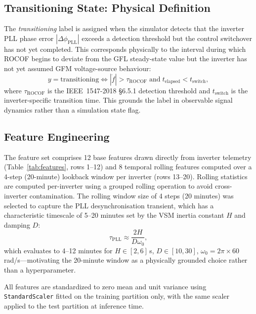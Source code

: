 \documentclass[journal]{IEEEtran}
\begin{document}
\subsection{Transitioning State: Physical Definition}
\label{sec:transitioning_def}

The \emph{transitioning} label is assigned when the simulator detects
that the inverter PLL phase error $|\Delta\phi_\text{PLL}|$ exceeds
a detection threshold but the control switchover has not yet completed.
This corresponds physically to the interval during which ROCOF begins
to deviate from the GFL steady-state value but the inverter has not yet
assumed GFM voltage-source behaviour:
\begin{equation}
  y = \text{transitioning} \iff
  |\dot{f}| > \tau_{\text{ROCOF}}
  \;\text{and}\;
  t_\text{elapsed} < t_\text{switch},
  \label{eq:trans_def}
\end{equation}
where $\tau_{\text{ROCOF}}$ is the IEEE~1547-2018 \S6.5.1 detection
threshold and $t_\text{switch}$ is the inverter-specific transition time.
This grounds the label in observable signal dynamics rather than a
simulation state flag.

\subsection{Feature Engineering}

The feature set comprises 12 base features drawn directly from inverter
telemetry (Table~\ref{tab:features}, rows 1--12) and 8 temporal rolling
features computed over a 4-step (20-minute) lookback window per inverter
(rows 13--20).
Rolling statistics are computed per-inverter using a grouped rolling
operation to avoid cross-inverter contamination.
The rolling window size of 4 steps (20 minutes) was selected to capture
the PLL desynchronisation transient, which has a characteristic timescale
of 5--20 minutes set by the VSM inertia constant $H$ and damping $D$:
\begin{equation}
  \tau_\text{PLL} \approx \frac{2H}{D \omega_0},
  \label{eq:tau_pll}
\end{equation}
which evaluates to 4--12 minutes for $H \in [2, 6]$\,s, $D \in [10, 30]$,
$\omega_0 = 2\pi \times 60$\,rad/s---motivating the 20-minute window as a
physically grounded choice rather than a hyperparameter.

All features are standardized to zero mean and unit variance using
\texttt{StandardScaler} fitted on the training partition only,
with the same scaler applied to the test partition at inference time.
\end{document}
